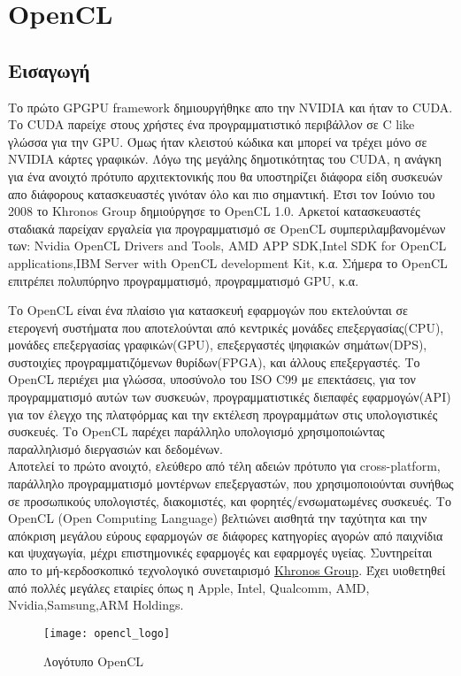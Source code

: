 \section{OpenCL}
\subsection{Εισαγωγή}
Το πρώτο GPGPU framework δημιουργήθηκε απο την NVIDIA και ήταν το CUDA. Το CUDA παρείχε στους χρήστες ένα προγραμματιστικό περιβάλλον σε C like γλώσσα για την GPU. Όμως ήταν κλειστού κώδικα και μπορεί να τρέχει μόνο σε NVIDIA κάρτες γραφικών. Λόγω της μεγάλης δημοτικότητας του CUDA, η ανάγκη για ένα ανοιχτό πρότυπο αρχιτεκτονικής που θα υποστηρίζει διάφορα είδη συσκευών απο διάφορους κατασκευαστές γινόταν όλο και πιο σημαντική. Έτσι τον Ιούνιο του 2008 το Khronos Group δημιούργησε το OpenCL 1.0. Αρκετοί κατασκευαστές σταδιακά παρείχαν εργαλεία για προγραμματισμό σε OpenCL συμπεριλαμβανομένων των: Nvidia OpenCL Drivers and Tools, AMD APP SDK,Intel SDK for OpenCL applications,IBM Server with OpenCL development Kit, κ.α. Σήμερα το OpenCL επιτρέπει πολυπύρηνο προγραμματισμό, προγραμματισμό GPU, κ.α.\cite{opencl-1}   

Το OpenCL είναι ένα πλαίσιο για κατασκευή εφαρμογών που εκτελούνται σε ετερογενή συστήματα που αποτελούνται από κεντρικές μονάδες επεξεργασίας(CPU), μονάδες επεξεργασίας γραφικών(GPU), επεξεργαστές ψηφιακών σημάτων(DPS), συστοιχίες προγραμματιζόμενων θυρίδων(FPGA), και άλλους επεξεργαστές. Το OpenCL περιέχει μια γλώσσα, υποσύνολο του ISO C99 με επεκτάσεις, για τον προγραμματισμό αυτών των συσκευών, προγραμματιστικές διεπαφές εφαρμογών(API) για τον έλεγχο της πλατφόρμας και την εκτέλεση προγραμμάτων στις υπολογιστικές συσκευές. Το OpenCL παρέχει παράλληλο υπολογισμό χρησιμοποιώντας παραλληλισμό διεργασιών και δεδομένων.\\
Αποτελεί το πρώτο ανοιχτό, ελεύθερο από τέλη αδειών πρότυπο για cross-platform, παράλληλο προγραμματισμό μοντέρνων επεξεργαστών, που χρησιμοποιούνται συνήθως σε προσωπικούς υπολογιστές, διακομιστές, και φορητές/ενσωματωμένες συσκευές. Το OpenCL (Open Computing Language) βελτιώνει αισθητά την ταχύτητα και την απόκριση μεγάλου εύρους εφαρμογών σε διάφορες κατηγορίες αγορών από παιχνίδια και ψυχαγωγία, μέχρι επιστημονικές εφαρμογές και εφαρμογές υγείας. Συντηρείται απο το μή-κερδοσκοπικό τεχνολογικό συνεταιρισμό \href{http://www.khronos.org}{Khronos Group}. Έχει υιοθετηθεί από πολλές μεγάλες εταιρίες όπως η Apple, Intel, Qualcomm, AMD, Nvidia,Samsung,ARM Holdings.
\begin{figure}[h]
	\texttt{[image: opencl\_logo]}
	\centering
	\caption{Λογότυπο OpenCL}
\end{figure}
